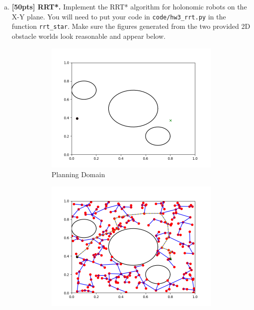 \documentclass{article}
\begin{document}
\begin{enumerate}[(a)]
\item {\bf [50pts] RRT*.} Implement the RRT* algorithm for holonomic robots on the X-Y plane. You will need to put your code in \texttt{code/hw3\_rrt.py} in the function \texttt{rrt\_star}. Make sure the figures generated from the two provided 2D obstacle worlds look reasonable and appear below.

\begin{figure}[h!]
    \centering
    \begin{subfigure}{0.3\textwidth}
		\centering
		\includegraphics[width=\textwidth]{../figures/rrt_star_run1-empty.png}
		\caption{Planning Domain}
	\end{subfigure}
	\hspace{0.05in}
    \begin{subfigure}{0.3\textwidth}
        \centering
        \includegraphics[width=\textwidth]{../figures/rrt_comparison_run1.png}

\end{subfigure}
\end{figure}
\end{enumerate}
\end{document}
